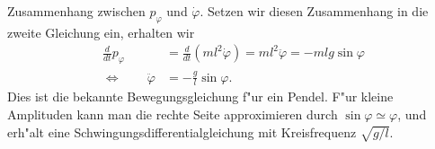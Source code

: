 \begin{loesung}
\begin{teilaufgaben}
Zusammenhang zwischen $p_\varphi$ und $\dot\varphi$.
Setzen wir diesen Zusammenhang in die zweite Gleichung ein, erhalten
wir
\begin{align*}
\frac{d}{dt}p_\varphi
&=
\frac{d}{dt}(ml^2\dot\varphi)
=
ml^2\ddot\varphi
=
-mlg\sin\varphi
\\
\Leftrightarrow
\qquad
\ddot\varphi
&=
-\frac{g}{l}\sin\varphi.
\end{align*}
Dies ist die bekannte Bewegungsgleichung f"ur ein Pendel. 
F"ur kleine Amplituden kann man die rechte Seite approximieren durch
$\sin\varphi\simeq\varphi$, und erh"alt eine Schwingungsdifferentialgleichung
mit Kreisfrequenz $\sqrt{g/l}$.
\end{teilaufgaben}
\end{loesung}


